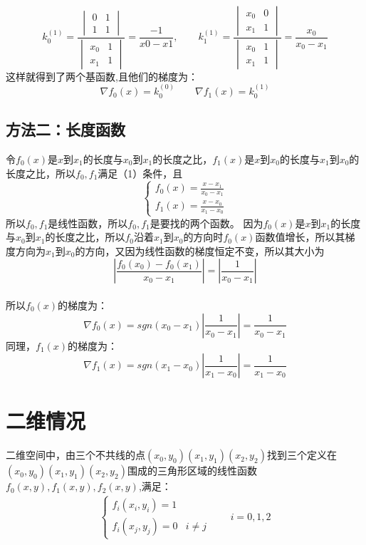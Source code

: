 \documentclass[12pt,a4paper]{article}
\begin{document}
$$
k_0^{(1)}=\frac{\begin{vmatrix}
                               0&1\\
                               1&1
                              \end{vmatrix}}{\begin{vmatrix}
                                              x_0&1\\
                                              x_1&1
                                             \end{vmatrix}}=\frac{-1}{x0-x1},\qquad
k_1^{(1)}=\frac{\begin{vmatrix}
                               x_0&0\\
                               x_1&1
                              \end{vmatrix}}{\begin{vmatrix}
                                              x_0&1\\
                                              x_1&1
                                             \end{vmatrix}}=\frac{x_0}{x_0-x_1}                                             
$$
这样就得到了两个基函数,且他们的梯度为：
$$
\nabla f_0(x)=k_0^{(0)}\qquad \nabla f_1(x)=k_0^{(1)}
$$
\subsection*{方法二：长度函数}
令$f_0(x)$是$x$到$x_1$的长度与$x_0$到$x_1$的长度之比，$f_1(x)$是$x$到$x_0$的长度与$x_1$到$x_0$的长度之比，所以$f_0,f_1$满足（1）条件，且
$$
\begin{cases}
f_0(x)=\frac{x-x_1}{x_0-x_1}\\
f_1(x)=\frac{x-x_0}{x_1-x_0}
\end{cases}
$$
所以$f_0,f_1$是线性函数，所以$f_0,f_1$是要找的两个函数。
因为$f_0(x)$是$x$到$x_1$的长度与$x_0$到$x_1$的长度之比，所以$f_0$沿着$x_1$到$x_0$的方向时$f_0(x)$函数值增长，所以其梯度方向为$x_1$到$x_0$的方向，又因为线性函数的梯度恒定不变，所以其大小为$$|\frac{f_0(x_0)-f_0(x_1)}{x_0-x_1}|=|\frac{1}{x_0-x_1}|$$\\
所以$f_0(x)$的梯度为：
$$
\nabla f_0(x)=sgn(x_0-x_1)|\frac{1}{x_0-x_1}|=\frac{1}{x_0-x_1}
$$
同理，$f_1(x)$的梯度为：
$$
\nabla f_1(x)=sgn(x_1-x_0)|\frac{1}{x_1-x_0}|=\frac{1}{x_1-x_0}
$$
\section{二维情况}
二维空间中，由三个不共线的点$(x_0,y_0)(x_1,y_1)(x_2,y_2)$找到三个定义在$(x_0,y_0)(x_1,y_1)(x_2,y_2)$围成的三角形区域的线性函数$f_0(x,y),f_1(x,y),f_2(x,y)$,满足：
\begin{align}
\begin{cases}
f_i(x_i,y_i)=1&{}\\
f_i(x_j,y_j)=0&i\ne j
\end{cases}
\qquad i=0,1,2
\end{align}
\end{document}
